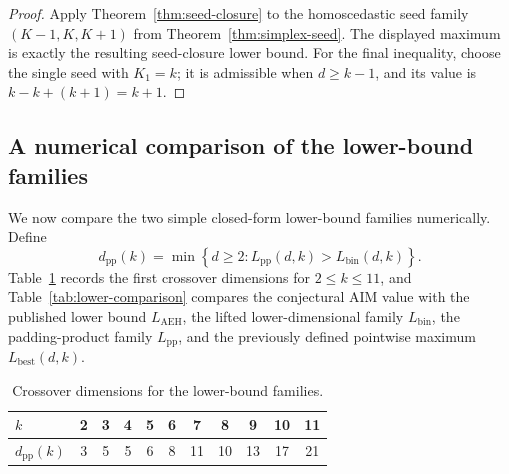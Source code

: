 \documentclass[11pt]{article}
\theoremstyle{plain}
\theoremstyle{definition}
\theoremstyle{remark}
\numberwithin{equation}{section}
\begin{document}
\begin{proof}
Apply Theorem~\ref{thm:seed-closure} to the homoscedastic seed family $(K-1,K,K+1)$ from Theorem~\ref{thm:simplex-seed}. The displayed maximum is exactly the resulting seed-closure lower bound. For the final inequality, choose the single seed with $K_1=k$; it is admissible when $d\ge k-1$, and its value is $k-k+(k+1)=k+1$.
\end{proof}

\subsection{A numerical comparison of the lower-bound families}\label{subsec:lower-numerical-comparison}

We now compare the two simple closed-form lower-bound families numerically. Define
\[
d_{\mathrm{pp}}(k)=\min\left\{d\ge 2: L_{\mathrm{pp}}(d,k)>L_{\mathrm{bin}}(d,k)\right\}.
\]
Table~\ref{tab:lower-crossover} records the first crossover dimensions for $2\le k\le 11$, and Table~\ref{tab:lower-comparison} compares the conjectural AIM value with the published lower bound $L_{\mathrm{AEH}}$, the lifted lower-dimensional family $L_{\mathrm{bin}}$, the padding-product family $L_{\mathrm{pp}}$, and the previously defined pointwise maximum $L_{\mathrm{best}}(d,k)$.

\begin{table}[htbp]
\centering
\caption{Crossover dimensions for the lower-bound families.}
\label{tab:lower-crossover}
\small
\begin{tabular}{lcccccccccc}
\toprule
$k$ & 2 & 3 & 4 & 5 & 6 & 7 & 8 & 9 & 10 & 11 \\
\midrule
$d_{\mathrm{pp}}(k)$ & 3 & 5 & 5 & 6 & 8 & 11 & 10 & 13 & 17 & 21 \\
\bottomrule
\end{tabular}
\end{table}
\end{document}

